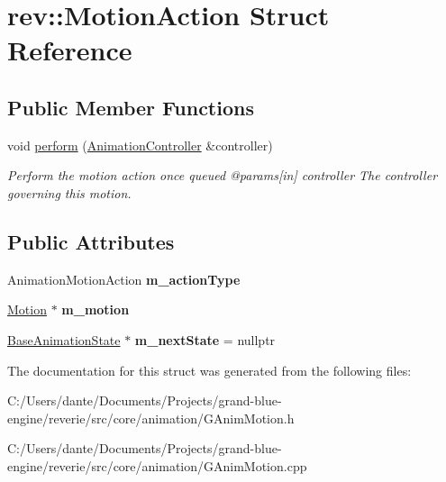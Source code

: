 \hypertarget{structrev_1_1_motion_action}{}\section{rev\+::Motion\+Action Struct Reference}
\label{structrev_1_1_motion_action}
\subsection*{Public Member Functions}
\begin{DoxyCompactItemize}
\item 
\mbox{\label{structrev_1_1_motion_action_ac24600657c34d4597ce609fb0435b953}} 
void \mbox{\hyperlink{structrev_1_1_motion_action_ac24600657c34d4597ce609fb0435b953}{perform}} (\mbox{\hyperlink{classrev_1_1_animation_controller}{Animation\+Controller}} \&controller)
\begin{DoxyCompactList}\small\item\em Perform the motion action once queued @params\mbox{[}in\mbox{]} controller The controller governing this motion. \end{DoxyCompactList}\end{DoxyCompactItemize}
\subsection*{Public Attributes}
\begin{DoxyCompactItemize}
\item 
\mbox{\label{structrev_1_1_motion_action_a3f98f585ca48002dc1fc5292431fa2f0}} 
Animation\+Motion\+Action {\bfseries m\+\_\+action\+Type}
\item 
\mbox{\label{structrev_1_1_motion_action_aebec6608730ef0dc728a7a1703a69aa5}} 
\mbox{\hyperlink{classrev_1_1_motion}{Motion}} $\ast$ {\bfseries m\+\_\+motion}
\item 
\mbox{\label{structrev_1_1_motion_action_afeaddceb641584fd012602037894c1cd}} 
\mbox{\hyperlink{classrev_1_1_base_animation_state}{Base\+Animation\+State}} $\ast$ {\bfseries m\+\_\+next\+State} = nullptr
\end{DoxyCompactItemize}


The documentation for this struct was generated from the following files\+:\begin{DoxyCompactItemize}
\item 
C\+:/\+Users/dante/\+Documents/\+Projects/grand-\/blue-\/engine/reverie/src/core/animation/G\+Anim\+Motion.\+h\item 
C\+:/\+Users/dante/\+Documents/\+Projects/grand-\/blue-\/engine/reverie/src/core/animation/G\+Anim\+Motion.\+cpp\end{DoxyCompactItemize}
